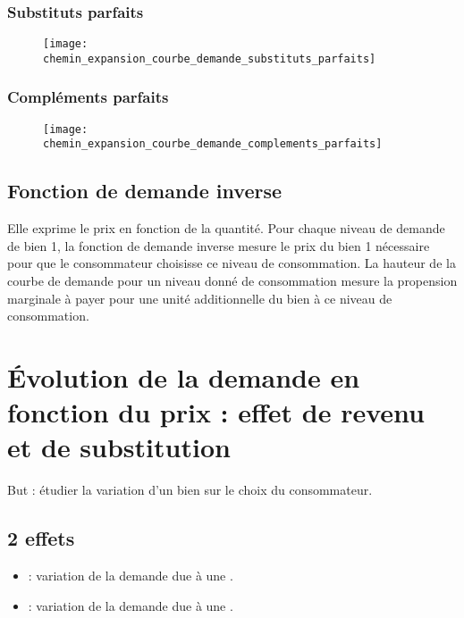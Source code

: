 \subsubsection{Substituts parfaits}

\begin{figure}[H]
	\centering
	\texttt{[image: chemin\_expansion\_courbe\_demande\_substituts\_parfaits]}
\end{figure}

\subsubsection{Compléments parfaits}

\begin{figure}[H]
	\centering
	\texttt{[image: chemin\_expansion\_courbe\_demande\_complements\_parfaits]}
\end{figure}

\subsection{Fonction de demande inverse}

Elle exprime le prix en fonction de la quantité. Pour chaque niveau de demande de bien 1, la fonction de demande inverse mesure le prix du bien 1 nécessaire pour que le consommateur choisisse ce niveau de consommation. La hauteur de la courbe de demande pour un niveau donné de consommation mesure la propension marginale à payer pour une unité additionnelle du bien à ce niveau de consommation.

\section{Évolution de la demande en fonction du prix : effet de revenu et de substitution}

But : étudier la variation d'un bien sur le choix du consommateur.

\subsection{2 effets}

\begin{itemize}
\item {} : variation de la demande due à une .
\item {} : variation de la demande due à une .
\end{itemize}

